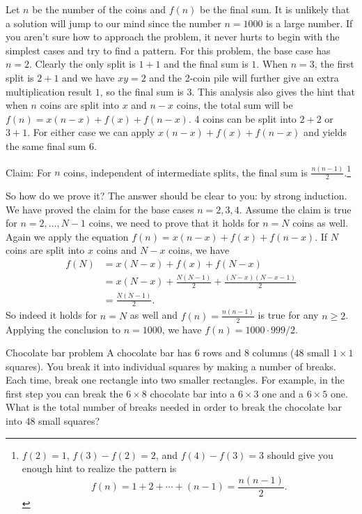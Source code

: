 
\begin{solution}
Let $n$ be the number of the coins and $f(n)$ be the final sum. It is unlikely that a solution will jump to our mind since the number $n=1000$ is a large number. If you aren't sure how to approach the problem, it never hurts to begin with the simplest cases and try to find a pattern. For this problem, the base case has $n=2$. Clearly the only split is $1+1$ and the final sum is $1$. When $n=3$, the first split is $2+1$ and we have $xy=2$ and the 2-coin pile will further give an extra multiplication result $1$, so the final sum is $3$. This analysis also gives the hint that when $n$ coins are split into $x$ and $n-x$ coins, the total sum will be
$f(n)=x(n-x)+f(x)+f(n-x)$. 4 coins can be split into $2+2$ or $3+1$. For either case we can apply $x(n-x)+f(x)+f(n-x)$ and yields the same final sum $6$.

\noindent Claim: For $n$ coins, independent of intermediate splits, the final sum is $\displaystyle\frac{n(n-1)}{2}$.\footnote[17]{$f(2)=1$, $f(3)-f(2)=2$, and $f(4)-f(3)=3$ should give you enough hint to realize the pattern is
\[
f(n)=1+2+\cdots+(n-1)=\frac{n(n-1)}{2}.
\]}

So how do we prove it? The answer should be clear to you: by strong induction. We have proved the claim for the base cases $n=2,3,4$. Assume the claim is true for $n=2,\ldots,N-1$ coins, we need to prove that it holds for $n=N$ coins as well. Again we apply the equation $f(n)=x(n-x)+f(x)+f(n-x)$. If $N$ coins are split into $x$ coins and $N-x$ coins, we have
\begin{align*}
f(N)&=x(N-x)+f(x)+f(N-x)\\
&=x(N-x)+\frac{N(N-1)}{2}
  +\frac{(N-x)(N-x-1)}{2}\\
&=\frac{N(N-1)}{2}.
\end{align*}
So indeed it holds for $n=N$ as well and $f(n)=\displaystyle\frac{n(n-1)}{2}$ is true for any $n\geq 2$. Applying the conclusion to $n=1000$, we have $f(n)=1000\cdot999/2$.

\end{solution}

\begin{problem}{Chocolate bar problem}
A chocolate bar has 6 rows and 8 columns (48 small $1\times1$ squares). You break it into individual squares by making a number of breaks. Each time, break one rectangle into two smaller rectangles. For example, in the first step you can break the $6\times8$ chocolate bar into a $6\times3$ one and a $6\times5$ one. What is the total number of breaks needed in order to break the chocolate bar into 48 small squares?
\end{problem}

